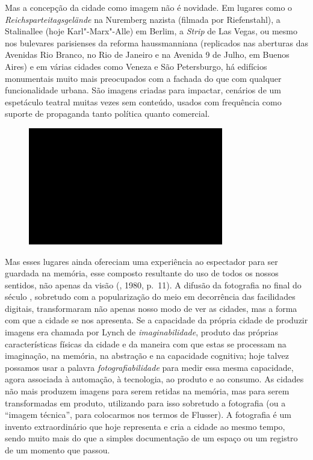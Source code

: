 Mas a concepção da cidade como imagem não é novidade. Em lugares como o
\emph{Reichsparteitagsgelände} na Nuremberg nazista (filmada por
Riefenstahl), a Stalinallee (hoje Karl"-Marx"-Alle) em Berlim,
a \emph{Strip} de Las Vegas, ou mesmo nos bulevares
parisienses da reforma haussmanniana (replicados nas aberturas das
Avenidas Rio Branco, no Rio de Janeiro e na Avenida 9 de Julho, em
Buenos Aires) e em várias cidades como Veneza e São Petersburgo, há
edifícios monumentais muito mais preocupados com a fachada do que com
qualquer funcionalidade urbana. São imagens criadas para impactar,
cenários de um espetáculo teatral muitas vezes sem conteúdo, usados com
frequência como suporte de propaganda tanto política quanto comercial.

\begin{figure}[!ht]

\centering
 \includegraphics[width=85mm]{./imgs/im1.jpg}
\caption{\tiny{}}

\end{figure}

Mas esses lugares ainda ofereciam uma experiência ao espectador para ser
guardada na memória, esse composto resultante do uso de todos os nossos
sentidos, não apenas da visão (, 1980, p.~11). A difusão da
fotografia no final do século , sobretudo com a popularização do meio
em decorrência das facilidades digitais, transformaram não apenas nosso
modo de ver as cidades, mas a forma com que a cidade se nos apresenta.
Se a capacidade da própria cidade de produzir imagens era chamada por
Lynch de \emph{imaginabilidade}, produto das próprias características
físicas da cidade e da maneira com que estas se processam na imaginação,
na memória, na abstração e na capacidade cognitiva; hoje talvez possamos
usar a palavra \emph{fotografiabilidade} para medir essa mesma
capacidade, agora associada à automação, à tecnologia, ao produto e ao
consumo. As cidades não mais produzem imagens para serem retidas na
memória, mas para serem transformadas em produto, utilizando para isso
sobretudo a fotografia (ou a ``imagem técnica'', para colocarmos nos
termos de Flusser). A fotografia é um invento extraordinário que hoje
representa e cria a cidade ao mesmo tempo, sendo muito mais do que a
simples documentação de um espaço ou um registro de um momento que
passou.

